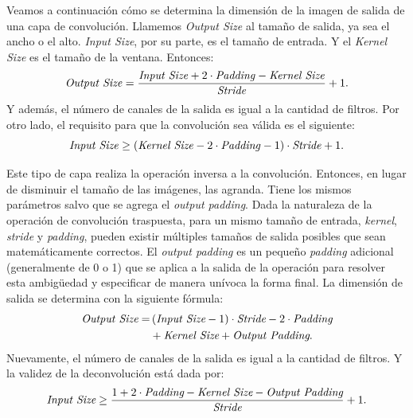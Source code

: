 Veamos a continuación cómo se determina la dimensión de la imagen de salida de una capa de convolución. Llamemos \emph{Output Size} al tamaño de salida, ya sea el ancho o el alto. \emph{Input Size}, por su parte, es el tamaño de entrada. Y el \emph{Kernel Size} es el tamaño de la ventana. Entonces:
\begin{equation}
    \text{\emph{Output Size}} = \frac{\text{\emph{Input Size}} + 2 \cdot \text{\emph{Padding}} - \text{\emph{Kernel Size}}}{\text{\emph{Stride}}} + 1.
\end{equation}
Y además, el número de canales de la salida es igual a la cantidad de filtros. Por otro lado, el requisito para que la convolución sea válida es el siguiente:
\begin{equation}
    \text{\emph{Input Size}} \geq (\text{\emph{Kernel Size}} - 2 \cdot \text{\emph{Padding}} - 1) \cdot \text{\emph{Stride}} + 1.
\end{equation}

Este tipo de capa realiza la operación inversa a la convolución. Entonces, en lugar de disminuir el tamaño de las imágenes, las agranda. Tiene los mismos parámetros salvo que se agrega el \emph{output padding}. Dada la naturaleza de la operación de convolución traspuesta, para un mismo tamaño de entrada, \emph{kernel}, \emph{stride} y \emph{padding}, pueden existir múltiples tamaños de salida posibles que sean matemáticamente correctos. El \emph{output padding} es un pequeño \emph{padding} adicional (generalmente de 0 o 1) que se aplica a la salida de la operación para resolver esta ambigüedad y especificar de manera unívoca la forma final. La dimensión de salida se determina con la siguiente fórmula:
\begin{equation}
\begin{split}
    \emph{\text{Output Size}} = &\, (\emph{\text{Input Size}} - 1) \cdot \emph{\text{Stride}} - 2 \cdot \emph{\text{Padding}} \\
                         & + \emph{\text{Kernel Size}} + \emph{\text{Output Padding}}.
\end{split}
\end{equation}
Nuevamente, el número de canales de la salida es igual a la cantidad de filtros. Y la validez de la deconvolución está dada por:
\begin{equation}
    \emph{\text{Input Size}} \geq \frac{1 + 2\cdot\emph{\text{Padding}} - \emph{\text{Kernel Size}} - \emph{\text{Output Padding}}}{\emph{\text{Stride}}} + 1.
\end{equation}

